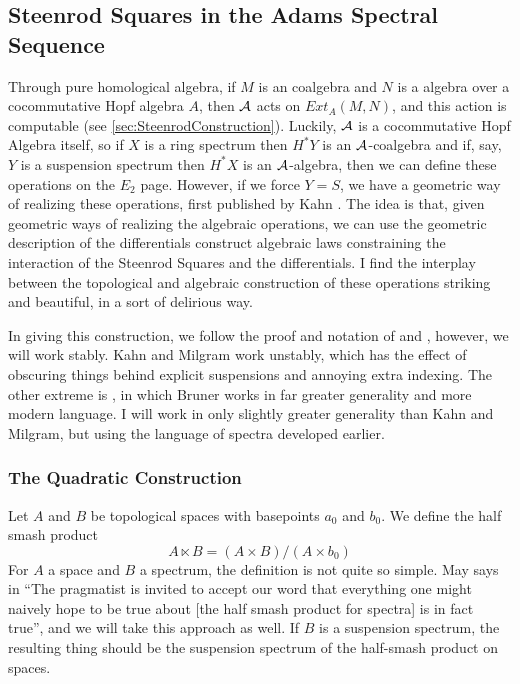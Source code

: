 \subsection{Steenrod Squares in the Adams Spectral Sequence}

Through pure homological algebra, if $M$ is an coalgebra and $N$ is a algebra over a cocommutative Hopf algebra $A$, then $\mathcal{A}$ acts on $Ext_A(M,N)$, and this action is computable (see \ref{sec:SteenrodConstruction}).  
Luckily, $\mathcal{A}$ is a cocommutative Hopf Algebra itself, so if $X$ is a ring spectrum then $H^*Y$ is an $\mathcal{A}$-coalgebra and if, say, $Y$ is a suspension spectrum then $H^*X$ is an $\mathcal{A}$-algebra, then we can define these operations on the $E_2$ page.  
However, if we force $Y=S$, we have a geometric way of realizing these operations, first published by Kahn \cite{kahnCupi}.  
The idea is that, given geometric ways of realizing the algebraic operations, we can use the geometric description of the differentials construct algebraic laws constraining the interaction of the Steenrod Squares and the differentials.  
I find the interplay between the topological and algebraic construction of these operations striking and beautiful, in a sort of delirious way.  


In giving this construction, we follow the proof and notation of \cite{kahnCupi} and \cite{milgramGroupReps}, however, we will work stably.  
Kahn and Milgram work unstably, which has the effect of obscuring things behind explicit suspensions and annoying extra indexing.  
The other extreme is \cite[Ch~IV.4]{H00RingSpectra}, in which Bruner works in far greater generality and more modern language.
I will work in only slightly greater generality than Kahn and Milgram, but using the language of spectra developed earlier.  

\subsubsection{The Quadratic Construction}

\label{sec:quadConst}

Let $A$ and $B$ be topological spaces with basepoints $a_0$ and $b_0$.  
We define the half smash product
\[A\ltimes B = (A\times B)/(A\times b_0)\]
For $A$ a space and $B$ a spectrum, the definition is not quite so simple.  May says in \cite{H00RingSpectra} ``The pragmatist is invited to accept our word that everything one might naively hope to be true about [the half smash product for spectra] is in fact true'', and we will take this approach as well.  If $B$ is a suspension spectrum, the resulting thing should be the suspension spectrum of the half-smash product on spaces.  

